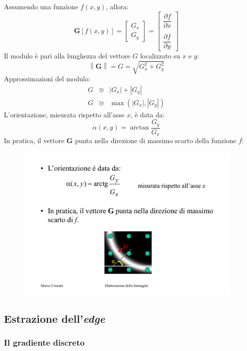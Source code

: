 \documentclass[a4paper]{article}
\begin{document}
	\noindent
	Assumendo una funzione $f\left(x,y\right)$, allora:
	\begin{equation*}
		\boldsymbol{G}\left[f\left(x,y\right)\right] = \begin{bmatrix}
			G_{x} \\
			G_{y}
		\end{bmatrix} = \begin{bmatrix}
		\dfrac{\partial f}{\partial x} \\
		\\
		\dfrac{\partial f}{\partial y}
	\end{bmatrix}
	\end{equation*}
	Il modulo è pari alla lunghezza del vettore $G$ localizzato su $x$ e $y$:
	\begin{equation*}
		\left\| \boldsymbol{G} \right\| = G = \sqrt{G_{x}^{2} + G_{y}^{2}}
	\end{equation*}
	Approssimazioni del modulo:
	\begin{equation*}
		\begin{array}{lll}
			G & \cong & \left| G_{x} \right| + \left| G_{y} \right| \\
			G & \cong & \max\left(\left| G_{x} \right|, \left| G_{y} \right|\right)
		\end{array}	
	\end{equation*}
	L'orientazione, misurata rispetto all'asse $x$, è data da:
	\begin{equation*}
		\alpha\left(x,y\right) = \arctan\dfrac{G_{y}}{G_{x}}
	\end{equation*}
	In pratica, il vettore $\boldsymbol{G}$ punta nella direzione di massimo scarto della funzione $f$:
	\begin{figure}[!htp]
		\centering
		\includegraphics[width=.3\textwidth]{img/gradiente_direzione.pdf}
	\end{figure}\newpage
	
	\subsection{Estrazione dell'\emph{edge}}
	
	\subsubsection{Il gradiente discreto}
	
\end{document}
